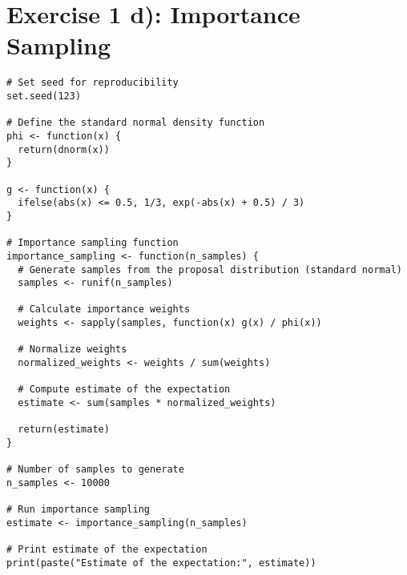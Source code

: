 \section*{Exercise 1 d): Importance Sampling}
\begin{tcolorbox}[colback=white!95!black,colframe=white!50!black,breakable]
\begin{lstlisting}[caption={Exercise 1d}, label={lst:importance}]
# Set seed for reproducibility
set.seed(123)

# Define the standard normal density function
phi <- function(x) {
  return(dnorm(x))
}

g <- function(x) {
  ifelse(abs(x) <= 0.5, 1/3, exp(-abs(x) + 0.5) / 3)
}

# Importance sampling function
importance_sampling <- function(n_samples) {
  # Generate samples from the proposal distribution (standard normal)
  samples <- runif(n_samples)
  
  # Calculate importance weights
  weights <- sapply(samples, function(x) g(x) / phi(x))
  
  # Normalize weights
  normalized_weights <- weights / sum(weights)
  
  # Compute estimate of the expectation
  estimate <- sum(samples * normalized_weights)
  
  return(estimate)
}

# Number of samples to generate
n_samples <- 10000

# Run importance sampling
estimate <- importance_sampling(n_samples)

# Print estimate of the expectation
print(paste("Estimate of the expectation:", estimate))
\end{lstlisting}
\end{tcolorbox}
\vspace{15mm}

